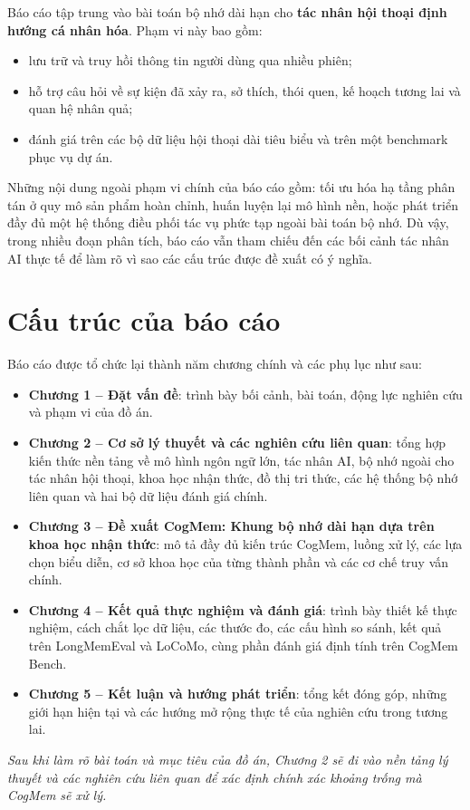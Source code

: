 \documentclass[../main.tex]{subfiles}
\begin{document}
Báo cáo tập trung vào bài toán bộ nhớ dài hạn cho \textbf{tác nhân hội thoại định hướng cá nhân hóa}. Phạm vi này bao gồm:

\begin{itemize}
    \item lưu trữ và truy hồi thông tin người dùng qua nhiều phiên;
    \item hỗ trợ câu hỏi về sự kiện đã xảy ra, sở thích, thói quen, kế hoạch tương lai và quan hệ nhân quả;
    \item đánh giá trên các bộ dữ liệu hội thoại dài tiêu biểu và trên một benchmark phục vụ dự án.
\end{itemize}

Những nội dung ngoài phạm vi chính của báo cáo gồm: tối ưu hóa hạ tầng phân tán ở quy mô sản phẩm hoàn chỉnh, huấn luyện lại mô hình nền, hoặc phát triển đầy đủ một hệ thống điều phối tác vụ phức tạp ngoài bài toán bộ nhớ. Dù vậy, trong nhiều đoạn phân tích, báo cáo vẫn tham chiếu đến các bối cảnh tác nhân AI thực tế để làm rõ vì sao các cấu trúc được đề xuất có ý nghĩa.

\section{Cấu trúc của báo cáo}

Báo cáo được tổ chức lại thành năm chương chính và các phụ lục như sau:

\begin{itemize}
    \item \textbf{Chương 1 -- Đặt vấn đề}: trình bày bối cảnh, bài toán, động lực nghiên cứu và phạm vi của đồ án.
    \item \textbf{Chương 2 -- Cơ sở lý thuyết và các nghiên cứu liên quan}: tổng hợp kiến thức nền tảng về mô hình ngôn ngữ lớn, tác nhân AI, bộ nhớ ngoài cho tác nhân hội thoại, khoa học nhận thức, đồ thị tri thức, các hệ thống bộ nhớ liên quan và hai bộ dữ liệu đánh giá chính.
    \item \textbf{Chương 3 -- Đề xuất CogMem: Khung bộ nhớ dài hạn dựa trên khoa học nhận thức}: mô tả đầy đủ kiến trúc CogMem, luồng xử lý, các lựa chọn biểu diễn, cơ sở khoa học của từng thành phần và các cơ chế truy vấn chính.
    \item \textbf{Chương 4 -- Kết quả thực nghiệm và đánh giá}: trình bày thiết kế thực nghiệm, cách chắt lọc dữ liệu, các thước đo, các cấu hình so sánh, kết quả trên LongMemEval và LoCoMo, cùng phần đánh giá định tính trên CogMem Bench.
    \item \textbf{Chương 5 -- Kết luận và hướng phát triển}: tổng kết đóng góp, những giới hạn hiện tại và các hướng mở rộng thực tế của nghiên cứu trong tương lai.
\end{itemize}

\vspace{1em}
\noindent\textit{Sau khi làm rõ bài toán và mục tiêu của đồ án, Chương 2 sẽ đi vào nền tảng lý thuyết và các nghiên cứu liên quan để xác định chính xác khoảng trống mà CogMem sẽ xử lý.}
\end{document}
